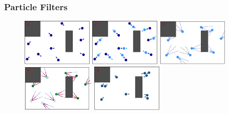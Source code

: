 \begin{frame}\frametitle{Particle Filters}
  \begin{figure}
    \centering
    \includegraphics[width=0.30\textwidth]{Figures/MotionPlanning/ParticleFilter1.pdf}
    \includegraphics[width=0.30\textwidth]{Figures/MotionPlanning/ParticleFilter2.pdf}
    \includegraphics[width=0.30\textwidth]{Figures/MotionPlanning/ParticleFilter3.pdf}
    \includegraphics[width=0.31\textwidth]{Figures/MotionPlanning/ParticleFilter4.pdf}
    \includegraphics[width=0.30\textwidth]{Figures/MotionPlanning/ParticleFilter5.pdf}
  \end{figure}
\end{frame}
